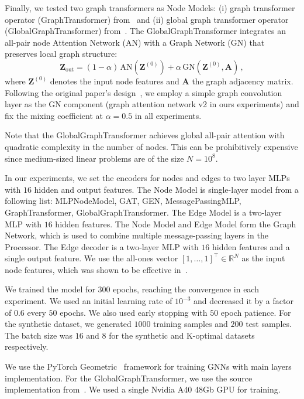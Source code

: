 \documentclass[10pt]{article} %
\theoremstyle{plain}
\theoremstyle{definition}
\theoremstyle{remark}
\begin{document}
Finally, we tested two graph transformers as Node Models: (i) graph transformer operator (GraphTransformer) from~\citet{shi2020masked} and (ii) global graph transformer operator (GlobalGraphTransformer) from~\citet{wu2023sgformer}. The GlobalGraphTransformer integrates an all-pair node Attention Network (AN) with a Graph Network (GN) that preserves local graph structure:
\begin{equation*}
    \label{eq:sgformer_update}
    \mathbf{Z}_{\text{out}}
    = (1 - \alpha) \, \mathrm{AN}(\mathbf{Z}^{(0)}) 
    + \alpha \, \mathrm{GN}(\mathbf{Z}^{(0)}, \mathbf{A})\, ,
\end{equation*}
where $\mathbf{Z}^{(0)}$ denotes the input node features and $\mathbf{A}$ the graph adjacency matrix. Following the original paper’s design~\citep{wu2023sgformer}, we employ a simple graph convolution layer as the GN component (graph attention network v2 in ours experiments) and fix the mixing coefficient at $\alpha=0.5$ in all experiments.

Note that the GlobalGraphTransformer achieves global all-pair attention with quadratic complexity in the number of nodes. This can be prohibitively expensive since medium-sized linear problems are of the size $N=10^{8}$.

In our experiments, we set the encoders for nodes and edges to two layer MLPs with $16$ hidden and output features. The Node Model is single-layer model from a following list: MLPNodeModel, GAT, GEN, MessagePassingMLP, GraphTransformer, GlobalGraphTransformer. The Edge Model is a two-layer MLP with $16$ hidden features. The Node Model and Edge Model form the Graph Network, which is used to combine multiple message-passing layers in the Processor. The Edge decoder is a two-layer MLP with $16$ hidden features and a single output feature. We use the all-ones vector $[1, \dots, 1]^\top \in \mathbb{R}^N$ as the input node features, which was shown to be effective in~\citet{trifonov2024learning}.

We trained the model for $300$ epochs, reaching the convergence in each experiment. We used an initial learning rate of $10^{-3}$ and decreased it by a factor of $0.6$ every $50$ epochs. We also used early stopping with $50$ epoch patience. For the synthetic dataset, we generated $1000$ training samples and $200$ test samples. The batch size was $16$ and $8$ for the synthetic and K-optimal datasets respectively. 

We use the PyTorch Geometric~\citep{Fey-Lenssen-2019} framework for training GNNs with main layers implementation. For the GlobalGraphTransformer, we use the source implementation from~\citet{wu2023sgformer}. We used a single Nvidia A40 48Gb GPU for training.
\end{document}
